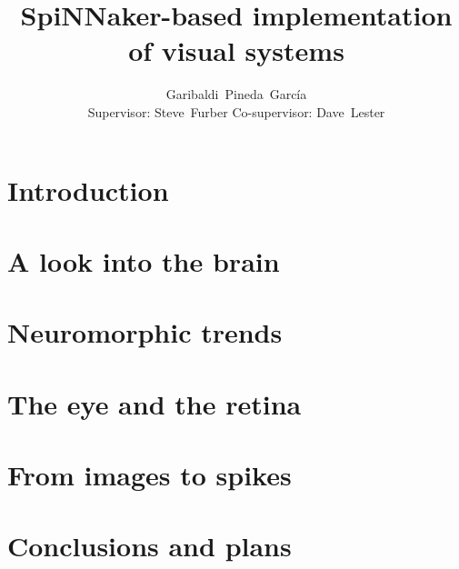 \documentclass[11pt,a4paper]{book}
\title{SpiNNaker-based implementation of visual systems}
\author{Garibaldi~Pineda~García \\ Supervisor: Steve~Furber Co-supervisor: Dave~Lester}
\date{}
\begin{document}
  \thispagestyle{empty}
  



  \cleardoublepage
  \tableofcontents
  \cleardoublepage


  
  \chapter{Introduction}
  
  \chapter{A look into the brain}
  
  \chapter{Neuromorphic trends}
  
  \chapter{The eye and the retina}
  
  \chapter{From images to spikes}
  
  \chapter{Conclusions and plans}
  
  
  
  
\end{document}
